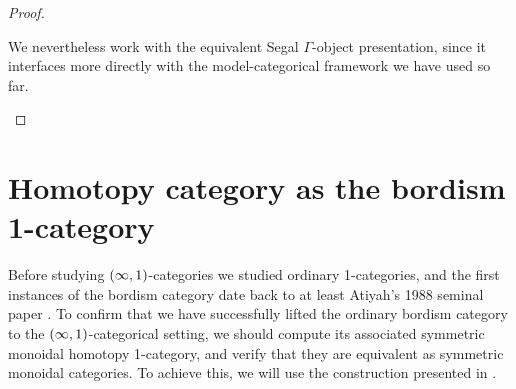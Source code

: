 \begin{proof}
\begin{remark}
        We nevertheless work with the equivalent Segal $\Gamma$-object presentation, since it interfaces more directly with the model-categorical framework we have used so far.
    \end{remark}
\end{proof}





\section{Homotopy category as the bordism 1-category}

Before studying $(\operatorname{\infty},1)$-categories we studied ordinary 1-categories, and the first instances of the bordism category date back to at least Atiyah's 1988 seminal paper \cite{At88}. To confirm that we have successfully lifted the ordinary bordism category to the $(\operatorname{\infty},1)$-categorical setting, we should compute its associated symmetric monoidal  homotopy 1-category, and verify that they are equivalent as symmetric monoidal categories. To achieve this, we will use the construction presented in .


